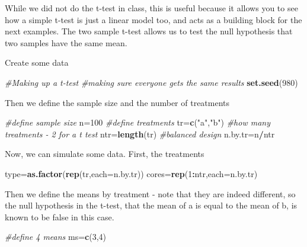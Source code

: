\documentclass[
]{book}
\newenvironment{Shaded}{\begin{snugshade}}{\end{snugshade}}
\newcommand{\AttributeTok}[1]{\textcolor[rgb]{0.13,0.29,0.53}{#1}}
\newcommand{\CommentTok}[1]{\textcolor[rgb]{0.56,0.35,0.01}{\textit{#1}}}
\newcommand{\DecValTok}[1]{\textcolor[rgb]{0.00,0.00,0.81}{#1}}
\newcommand{\FunctionTok}[1]{\textcolor[rgb]{0.13,0.29,0.53}{\textbf{#1}}}
\newcommand{\NormalTok}[1]{#1}
\newcommand{\OtherTok}[1]{\textcolor[rgb]{0.56,0.35,0.01}{#1}}
\newcommand{\SpecialCharTok}[1]{\textcolor[rgb]{0.81,0.36,0.00}{\textbf{#1}}}
\newcommand{\StringTok}[1]{\textcolor[rgb]{0.31,0.60,0.02}{#1}}
\begin{document}
While we did not do the t-test in class, this is useful because it allows you to see how a simple t-test is just a linear model too, and acts as a building block for the next examples. The two sample t-test allows us to test the null hypothesis that two samples have the same mean.

Create some data

\begin{Shaded}
\begin{Highlighting}[]
\CommentTok{\#Making up a t{-}test}
\CommentTok{\#making sure everyone gets the same results}
\FunctionTok{set.seed}\NormalTok{(}\DecValTok{980}\NormalTok{)}
\end{Highlighting}
\end{Shaded}

Then we define the sample size and the number of treatments

\begin{Shaded}
\begin{Highlighting}[]
\CommentTok{\#define sample size}
\NormalTok{n}\OtherTok{=}\DecValTok{100}
\CommentTok{\#define treatments}
\NormalTok{tr}\OtherTok{=}\FunctionTok{c}\NormalTok{(}\StringTok{"a"}\NormalTok{,}\StringTok{"b"}\NormalTok{)}
\CommentTok{\#how many treatments {-} 2 for a t test}
\NormalTok{ntr}\OtherTok{=}\FunctionTok{length}\NormalTok{(tr)}
\CommentTok{\#balanced design}
\NormalTok{n.by.tr}\OtherTok{=}\NormalTok{n}\SpecialCharTok{/}\NormalTok{ntr}
\end{Highlighting}
\end{Shaded}

Now, we can simulate some data. First, the treatments

\begin{Shaded}
\begin{Highlighting}[]
\NormalTok{type}\OtherTok{=}\FunctionTok{as.factor}\NormalTok{(}\FunctionTok{rep}\NormalTok{(tr,}\AttributeTok{each=}\NormalTok{n.by.tr))}
\NormalTok{cores}\OtherTok{=}\FunctionTok{rep}\NormalTok{(}\DecValTok{1}\SpecialCharTok{:}\NormalTok{ntr,}\AttributeTok{each=}\NormalTok{n.by.tr)}
\end{Highlighting}
\end{Shaded}

Then we define the means by treatment - note that they are indeed different, so the null hypothesis in the t-test, that the mean of a is equal to the mean of b, is known to be false in this case.

\begin{Shaded}
\begin{Highlighting}[]
\CommentTok{\#define 4 means}
\NormalTok{ms}\OtherTok{=}\FunctionTok{c}\NormalTok{(}\DecValTok{3}\NormalTok{,}\DecValTok{4}\NormalTok{)}
\end{Highlighting}
\end{Shaded}
\end{document}
